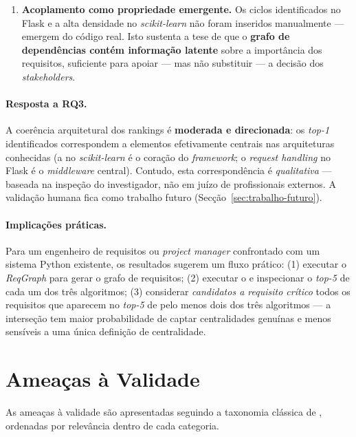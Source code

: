 \begin{enumerate}
    \item \textbf{Acoplamento como propriedade emergente.} Os ciclos
        identificados no Flask e a alta densidade no
        \emph{scikit-learn} não foram inseridos manualmente ---
        emergem do código real. Isto sustenta a tese de que o
        \textbf{grafo de dependências contém informação latente}
        sobre a importância dos requisitos, suficiente para apoiar
        --- mas não substituir --- a decisão dos
        \emph{stakeholders}.
\end{enumerate}

\paragraph{Resposta a RQ3.} A coerência arquitetural dos rankings é
\textbf{moderada e direcionada}: os \emph{top-1} identificados
correspondem a elementos efetivamente centrais nas arquiteturas
conhecidas (a  no \emph{scikit-learn} é o coração do
\emph{framework}; o \emph{request handling} no Flask é o
\emph{middleware} central). Contudo, esta correspondência é
\emph{qualitativa} --- baseada na inspeção do investigador, não em
juízo de profissionais externos. A validação humana fica como
trabalho futuro (Secção~\ref{sec:trabalho-futuro}).

\paragraph{Implicações práticas.}
Para um engenheiro de requisitos ou \emph{project manager}
confrontado com um sistema Python existente, os resultados sugerem
um fluxo prático: (1) executar o \emph{ReqGraph} para gerar o grafo
de requisitos; (2) executar o  e inspecionar o
\emph{top-5} de cada um dos três algoritmos; (3) considerar
\emph{candidatos a requisito crítico} todos os requisitos que
aparecem no \emph{top-5} de pelo menos dois dos três algoritmos ---
a interseção tem maior probabilidade de captar centralidades
genuínas e menos sensíveis a uma única definição de centralidade.

\section{Ameaças à Validade}
\label{sec:ameacas}

As ameaças à validade são apresentadas seguindo a taxonomia clássica
de \citet{wohlin2012}, ordenadas por relevância dentro de cada
categoria.

